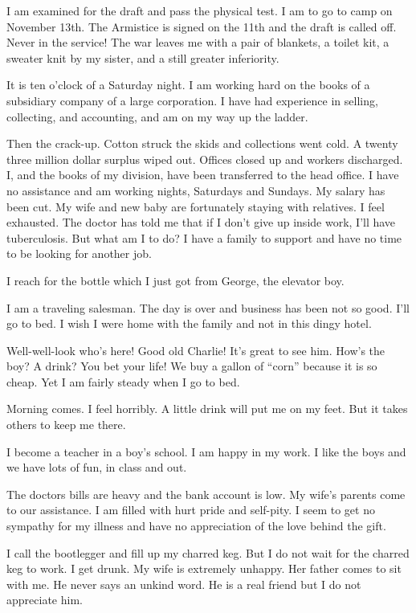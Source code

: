 \begin{biblechapter}
I am examined for the draft and pass the physical test. I am to go to camp on November 13th. The Armistice is signed on the 11th and the draft is called off. Never in the service! The war leaves me with a pair of blankets, a toilet kit, a sweater knit by my sister, and a still greater inferiority.

      It is ten o’clock of a Saturday night. I am working hard on the books of a subsidiary company of a large corporation. I have had experience in selling, collecting, and accounting, and am on my way up the ladder.

Then the crack-up. Cotton struck the skids and collections went cold. A twenty three million dollar surplus wiped out. Offices closed up and workers discharged. I, and the books of my division, have been transferred to the head office. I have no assistance and am working nights, Saturdays and Sundays. My salary has been cut. My wife and new baby are fortunately staying with relatives. I feel exhausted. The doctor has told me that if I don’t give up inside work, I’ll have tuberculosis. But what am I to do? I have a family to support and have no time to be looking for another job.

I reach for the bottle which I just got from George, the elevator boy.

I am a traveling salesman. The day is over and business has been not so good. I’ll go to bed. I wish I were home with the family and not in this dingy hotel.

Well-well-look who’s here! Good old Charlie! It’s great to see him. How’s the boy? A drink? You bet your life! We buy a gallon of “corn” because it is so cheap. Yet I am fairly steady when I go to bed.

Morning comes. I feel horribly. A little drink will put me on my feet. But it takes others to keep me there.

I become a teacher in a boy’s school. I am happy in my work. I like the boys and we have lots of fun, in class and out.

      The doctors bills are heavy and the bank account is low. My wife’s parents come to our assistance. I am filled with hurt pride and self-pity. I seem to get no sympathy for my illness and have no appreciation of the love behind the gift.

I call the bootlegger and fill up my charred keg. But I do not wait for the charred keg to work. I get drunk. My wife is extremely unhappy. Her father comes to sit with me. He never says an unkind word. He is a real friend but I do not appreciate him.


\end{biblechapter}

